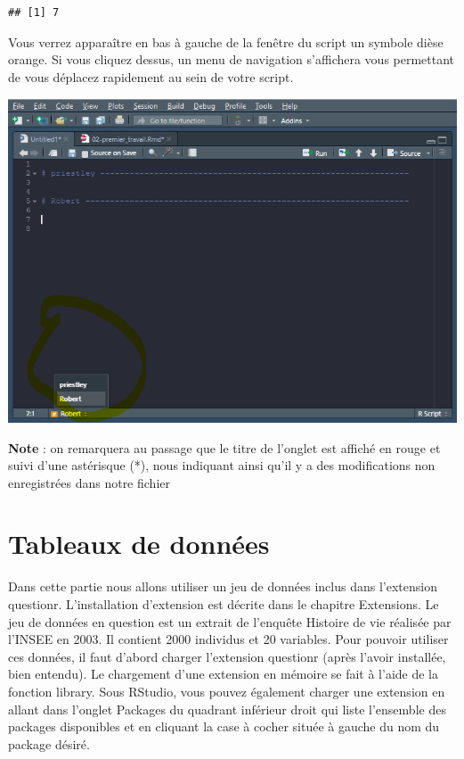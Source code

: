 \documentclass[
]{book}
\begin{document}
\begin{verbatim}
## [1] 7
\end{verbatim}

Vous verrez apparaître en bas à gauche de la fenêtre du script un symbole dièse orange. Si vous cliquez dessus, un menu de navigation s'affichera vous permettant de vous déplacez rapidement au sein de votre script.

\includegraphics[width=1\linewidth]{images/script_section}

\textbf{Note} : on remarquera au passage que le titre de l'onglet est affiché en rouge et suivi d'une astérisque (*), nous indiquant ainsi qu'il y a des modifications non enregistrées dans notre
fichier

\hypertarget{tableaux-de-donnuxe9es}{%
\section{Tableaux de données}\label{tableaux-de-donnuxe9es}}

Dans cette partie nous allons utiliser un jeu de données inclus dans l'extension questionr. L'installation d'extension est décrite dans le chapitre Extensions.
Le jeu de données en question est un extrait de l'enquête Histoire de vie réalisée par l'INSEE en 2003. Il contient 2000 individus et 20 variables. Pour pouvoir utiliser ces données, il faut d'abord charger l'extension questionr (après l'avoir installée, bien entendu). Le chargement d'une extension en mémoire se fait à l'aide de la fonction library. Sous RStudio, vous pouvez également charger une extension en allant dans l'onglet Packages du quadrant inférieur droit qui liste l'ensemble des packages disponibles et en cliquant la case à cocher située à gauche du nom du package désiré.
\end{document}
